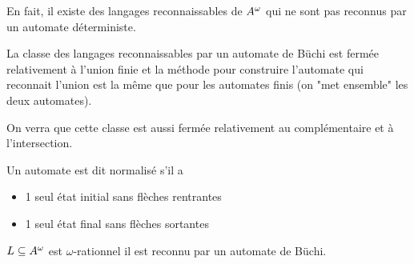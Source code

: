 En fait, il existe des langages reconnaissables de $A^{\omega}$ qui ne sont pas reconnus par un automate déterministe.



La classe des langages reconnaissables par un automate de Büchi est fermée relativement à l'union finie
et la méthode pour construire l'automate qui reconnait l'union est la même que pour les automates finis (on "met ensemble"
les deux automates).

On verra que cette classe est aussi fermée relativement au complémentaire et à l'intersection.


\begin{definition}
	Un automate est dit normalisé s'il a

	\begin{itemize}
		\item 1 seul état initial sans flèches rentrantes
		\item 1 seul état final sans flèches sortantes
	\end{itemize}
\end{definition}

\begin{theorem}
	$L \subseteq A^{\omega}$ est $\omega$-rationnel \ssi il est reconnu par un automate de Büchi.
\end{theorem}

